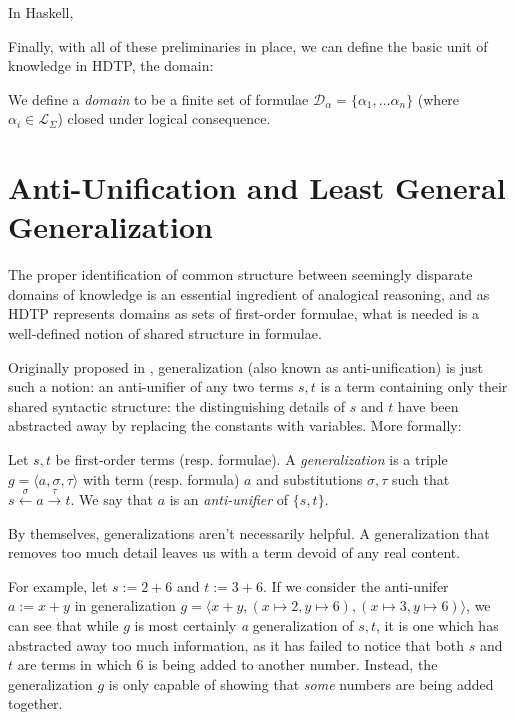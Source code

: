 \documentclass[12pt,a4paper]{article}
\begin{document}
In Haskell, 

Finally, with all of these preliminaries in place, we can define the basic unit of knowledge in HDTP, the domain:

\begin{definition}[Domain]
    We define a \textit{domain} to be a finite set of formulae $\mathcal{D}_\alpha = \{\alpha_1, \dots \alpha_n\}$ (where $\alpha_i \in \mathcal{L}_\Sigma$) closed under logical consequence.
\end{definition}


% 

\section{Anti-Unification and Least General Generalization}
The proper identification of common structure between seemingly disparate domains of knowledge is an essential ingredient of analogical reasoning, and as HDTP represents domains as sets of first-order formulae, what is needed is a well-defined notion of shared structure in formulae.



Originally proposed in \cite{Plotkin70}, generalization (also known as anti-unification) is just such a notion: an anti-unifier of any two terms $s,t$ is a term containing only their shared syntactic structure: the distinguishing details of $s$ and $t$ have been abstracted away by replacing the constants with variables. More formally:

\begin{definition}
    Let $s, t$ be first-order terms (resp. formulae). A \textit{generalization} is a triple $g = \langle a, \sigma, \tau \rangle$ with term (resp. formula) $a$ and substitutions $\sigma, \tau$ such that $s \xleftarrow{\sigma} a \xrightarrow{\tau} t$.
    We say that $a$ is an \textit{anti-unifier} of $\{s,t\}$.
\end{definition}


\begin{definition}
    
\end{definition}


By themselves, generalizations aren't necessarily helpful. A generalization that removes too much detail leaves us with a term devoid of any real content.

For example, let $s := 2+6$ and $t:= 3+6$. If we consider the anti-unifer $a:= x+y$ in generalization $g = \langle x+y, (x \mapsto 2, y \mapsto 6), (x\mapsto 3, y \mapsto 6)\rangle$, we can see that while $g$ is most certainly \textit{a} generalization of $s,t$, it is one which has abstracted away too much information, as it has failed to notice that both $s$ and $t$ are terms in which $6$ is being added to another number. Instead, the generalization $g$ is only capable of showing that \textit{some} numbers are being added together. 
\end{document}
